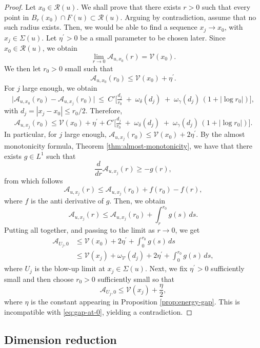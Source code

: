 \documentclass[reqno,11pt]{amsart}
\newcommand{\1}{\mathds{1}}  %
\numberwithin{equation}{section}
\begin{document}
\begin{proof}
Let $x_0 \in \mathcal{R}(u)$. We shall prove that there exists $r>0$ such that every point in $B_r(x_0) \cap F(u) \subset \mathcal{R}(u)$. Arguing by contradiction, assume that no such radius exists. Then, we would be able to find a sequence $x_j \to x_0$, with $x_j \in \Sigma(u)$. Let $\eta^\prime>0$ be a small parameter to be chosen later. Since $x_0 \in \mathcal{R}(u)$, we obtain
\[
    \lim_{r \to 0} \mathcal{A}_{u,x_0}(r) = \mathcal{V}(x_0).
\]
We then let $r_0>0$ small such that
\[
    \mathcal{A}_{u,x_0}(r_0) \le \mathcal{V}(x_0) + \eta^\prime.
\]
For $j$ large enough, we obtain
\begin{equation}\label{eq:Weiss-modulus-collapsed}
\big|\mathcal{A}_{u,x_0}(r_0)-\mathcal{A}_{u,x_j}(r_0)\big|
\ \le\
C'\Big[
\tfrac{d_j}{r_0}\;+\;\omega_\delta(d_j)\;+\;\omega_\gamma(d_j)\,(1+|\log r_0|)
\Big],
\end{equation}
with $d_j = |x_j - x_0| \le r_0/2$. Therefore,
\[
   \mathcal{A}_{u,x_j}(r_0) \le \mathcal{V}(x_0) + \eta^\prime + C'\Big[
\tfrac{d_j}{r_0}\;+\;\omega_\delta(d_j)\;+\;\omega_\gamma(d_j)\,(1+|\log r_0|)
\Big].
\]
In particular, for $j$ large enough, \(\mathcal{A}_{u,x_j}(r_0) \le \mathcal{V}(x_0) + 2\eta^\prime\). By the almost monotonicity formula, Theorem \ref{thm:almost-monotonicity}, we have that there exists $g \in L^1$ such that
\[
    \frac{d}{dr}\mathcal{A}_{u,x_j}(r) \geq -g(r),
\]
from which follows
\[
    \mathcal{A}_{u,x_j}(r) \le \mathcal{A}_{u,x_j}(r_0) + f(r_0) - f(r),
\]
where $f$ is the anti derivative of $g$. Then, we obtain
\[
    \mathcal{A}_{u,x_j}(r) \le \mathcal{A}_{u,x_j}(r_0) + \int_r^{r_0}g(s)\,ds.
\]
Putting all together, and passing to the limit as $r \to 0$, we get
\begin{align*}
    \mathcal{A}_{U_j,0} &\le \mathcal{V}(x_0) + 2\eta^\prime + \int_0^{r_0}g(s)\,ds\\
    & \le \mathcal{V}(x_j) + \omega_{\mathcal{V}}(d_j) + 2\eta^\prime + \int_0^{r_0}g(s)\,ds,
\end{align*}
where $U_j$ is the blow-up limit at $x_j \in \Sigma(u)$. Next, we fix $\eta^\prime > 0$ sufficiently small and then choose $r_0 > 0$ sufficiently small so that
\[
\mathcal{A}_{U_j,0} \leq \mathcal{V}(x_j) + \frac{\eta}{2},
\]
where $\eta$ is the constant appearing in Proposition \ref{prop:energy-gap}. This is incompatible with \eqref{eq:gap-at-0}, yielding a contradiction.
\end{proof}

\subsection{Dimension reduction}
\end{document}
